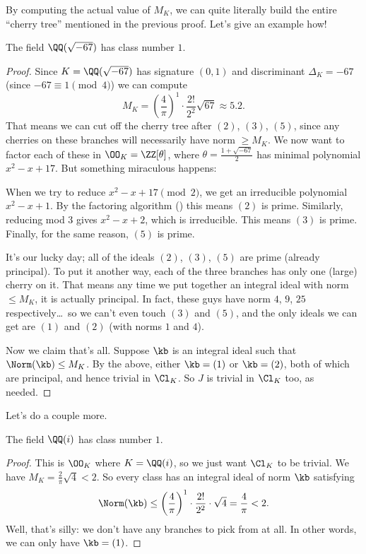 By computing the actual value of $M_K$,
we can quite literally build the entire ``cherry tree'' mentioned in the previous proof.
Let's give an example how!
\begin{proposition}
	The field $\QQ(\sqrt{-67})$ has class number $1$.
\end{proposition}
\begin{proof}
	Since $K = \QQ(\sqrt{-67})$ has signature $(0,1)$
	and discriminant $\Delta_K = -67$ (since $-67 \equiv 1 \pmod 4$)
	we can compute
	\[ M_K = \left( \frac 4\pi \right)^{1} \cdot \frac{2!}{2^2} \sqrt{67} \approx 5.2. \]
	That means we can cut off the cherry tree after $(2)$, $(3)$, $(5)$, since any
	cherries on these branches will necessarily have norm $\ge M_K$.
	We now want to factor each of these in $\OO_K = \ZZ[\theta]$, where $\theta = \frac{1+\sqrt{-67}}{2}$
	has minimal polynomial $x^2 - x + 17$.
	But something miraculous happens:
	\begin{itemize}
		\ii When we try to reduce $x^2-x+17 \pmod 2$, we get an irreducible polynomial $x^2-x+1$.
		By the factoring algorithm () this means $(2)$ is prime.
		\ii Similarly, reducing mod $3$ gives $x^2-x+2$, which is irreducible.
		This means $(3)$ is prime.
		\ii Finally, for the same reason, $(5)$ is prime.
	\end{itemize}
	It's our lucky day;
	all of the ideals $(2)$, $(3)$, $(5)$ are prime (already principal).
	To put it another way,
	each of the three branches has only one (large) cherry on it.
	That means any time we put together an integral ideal with norm $\le M_K$,
	it is actually principal.
	In fact, these guys have norm $4$, $9$, $25$ respectively\dots\
	so we can't even touch $(3)$ and $(5)$,
	and the only ideals we can get are $(1)$ and $(2)$ (with norms $1$ and $4$).

	Now we claim that's all.
	Suppose $\kb$ is an integral ideal such that $\Norm(\kb) \le M_K$.
	By the above, either $\kb = (1)$ or $\kb = (2)$, both of which are principal,
	and hence trivial in $\Cl_K$.
	So $J$ is trivial in $\Cl_K$ too, as needed.
\end{proof}
Let's do a couple more.
\begin{theorem}
	The field $\QQ(i)$ has class number $1$.
\end{theorem}
\begin{proof}
	This is $\OO_K$ where $K = \QQ(i)$, so we just want $\Cl_K$ to be trivial.
	We have $M_K = \frac{2}{\pi}\sqrt{4} < 2$.
	So every class
	has an integral ideal of norm $\kb$ satisfying
	\[
		\Norm(\kb)
		\le \left( \frac4\pi \right)^{1} \cdot \frac{2!}{2^2} \cdot \sqrt{4}
		= \frac4\pi < 2.
	\]
	Well, that's silly: we don't have any branches to pick from at all.
	In other words, we can only have $\kb = (1)$.
\end{proof}

